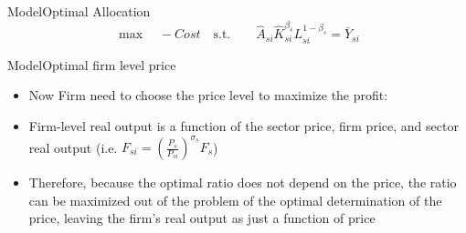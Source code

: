 \documentclass[aspectratio=169]{beamer}
\begin{document}
	\begin{frame}{Model}{Optimal Allocation}{\label{Firm_solution_General}}
		\begin{equation*}
			\max  \quad
				- 		Cost \quad \text{s.t.} \quad \quad \hat{A}_{si}\hat{K}_{si}^{\beta_s} L_{si}^{1-\beta_s} = \bar{Y}_{si}
		\end{equation*}
		\begin{equation*}
		
		\end{equation*}
		\begin{equation*}
			
		\end{equation*}
		\hfill
		
		\hyperlink{Firm_solution}{}
	\end{frame}
	\begin{frame}{Model}{Optimal firm level price}
		\begin{itemize}
			
			\item Now Firm need to choose the price level to maximize the profit:
			
			\item Firm-level real output is a function of the sector price, firm price, and sector real output (i.e. $F_{si} = (\frac{P_s}{ P_{si}})^{\sigma_s}{F}_s $)
			\item Therefore, because the optimal  ratio does not depend on the price, the ratio can be maximized out of the problem of the optimal determination of the price, leaving the firm’s real output as just a function of price
			
		\end{itemize}
	\end{frame}
\end{document}
